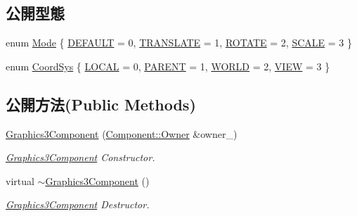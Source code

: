\subsection*{公開型態}
\begin{DoxyCompactItemize}
\item 
enum \hyperlink{class_magnum_1_1_graphics3_component_a3170b6656dd79c3c972f0d52e9386bdd}{Mode} \{ \hyperlink{class_magnum_1_1_graphics3_component_a3170b6656dd79c3c972f0d52e9386bdda56eee636ee9d8598f8c9b9e2235a6a87}{D\+E\+F\+A\+U\+LT} = 0, 
\hyperlink{class_magnum_1_1_graphics3_component_a3170b6656dd79c3c972f0d52e9386bdda5f0ec3d24f8baa58afa7964ba1777249}{T\+R\+A\+N\+S\+L\+A\+TE} = 1, 
\hyperlink{class_magnum_1_1_graphics3_component_a3170b6656dd79c3c972f0d52e9386bddaf061f5a6a0ad1541039c1e904c78d7a1}{R\+O\+T\+A\+TE} = 2, 
\hyperlink{class_magnum_1_1_graphics3_component_a3170b6656dd79c3c972f0d52e9386bdda6e43ba0a9531eaadaa4e3821d1f479b2}{S\+C\+A\+LE} = 3
 \}
\item 
enum \hyperlink{class_magnum_1_1_graphics3_component_a32845372c85d6d60db795a320f15e0ef}{Coord\+Sys} \{ \hyperlink{class_magnum_1_1_graphics3_component_a32845372c85d6d60db795a320f15e0efaeaa83dde105a6a22209e106dbacb7630}{L\+O\+C\+AL} = 0, 
\hyperlink{class_magnum_1_1_graphics3_component_a32845372c85d6d60db795a320f15e0efae641cafd9d08e429544785d5c0710db1}{P\+A\+R\+E\+NT} = 1, 
\hyperlink{class_magnum_1_1_graphics3_component_a32845372c85d6d60db795a320f15e0efa8686cb5a4c38c1636c07e7e18dad3305}{W\+O\+R\+LD} = 2, 
\hyperlink{class_magnum_1_1_graphics3_component_a32845372c85d6d60db795a320f15e0efa70b81273ddf2f4bb1db2d831b3dd51a9}{V\+I\+EW} = 3
 \}
\end{DoxyCompactItemize}
\subsection*{公開方法(Public Methods)}
\begin{DoxyCompactItemize}
\item 
\hyperlink{class_magnum_1_1_graphics3_component_a1bbcc164ca9180c75ba00ce80a20624d}{Graphics3\+Component} (\hyperlink{class_magnum_1_1_component_1_1_owner}{Component\+::\+Owner} \&owner\+\_\+)
\begin{DoxyCompactList}\small\item\em \hyperlink{class_magnum_1_1_graphics3_component}{Graphics3\+Component} Constructor. \end{DoxyCompactList}\item 
virtual \hyperlink{class_magnum_1_1_graphics3_component_a96ba278043f1bb3c3a6caeb4e3a47e3b}{$\sim$\+Graphics3\+Component} ()
\begin{DoxyCompactList}\small\item\em \hyperlink{class_magnum_1_1_graphics3_component}{Graphics3\+Component} Destructor. \end{DoxyCompactList}\end{DoxyCompactItemize}


